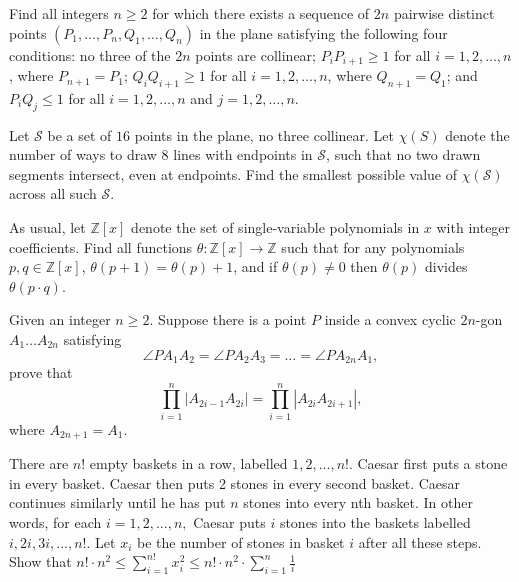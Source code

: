 \documentclass[11pt]{scrartcl}
\begin{document}
\begin{problem}[817429246000759]
Find all integers $n \geq 2$ for which there exists a sequence of $2n$ pairwise distinct points $(P_1, \dots, P_n, Q_1, \dots, Q_n)$ in the plane satisfying the following four conditions:
no three of the $2n$ points are collinear;
$P_iP_{i+1} \ge 1$ for all $i = 1, 2, \dots ,n$, where $P_{n+1}=P_1$;
$Q_iQ_{i+1} \ge 1$ for all $i = 1, 2, \dots, n$, where $Q_{n+1} = Q_1$; and
$P_iQ_j \le 1$ for all $i = 1, 2, \dots, n$ and $j = 1, 2, \dots, n$.

\end{problem}
\begin{problem}[711016608896725]
Let $\mathcal S$ be a set of $16$ points in the plane, no three collinear. Let $\chi(S)$ denote the number of ways to draw $8$ lines with endpoints in $\mathcal S$, such that no two drawn segments intersect, even at endpoints. Find the smallest possible value of $\chi(\mathcal S)$ across all such $\mathcal S$.
\end{problem}
\begin{problem}[620629352845047]
As usual, let ${\mathbb Z}[x]$ denote the set of single-variable polynomials in $x$ with integer coefficients. Find all functions $\theta : {\mathbb Z}[x] \to {\mathbb Z}$ such that for any polynomials $p,q \in {\mathbb Z}[x]$,
$\theta(p+1) = \theta(p)+1$, and
if $\theta(p) \neq 0$ then $\theta(p)$ divides $\theta(p \cdot q)$.
\end{problem}
\begin{problem}[702587891849077]
	Given an integer $n \geqslant 2$. Suppose there is a point $P$ inside a convex cyclic $2n$-gon $A_1 \ldots A_{2n}$ satisfying$$\angle PA_1A_2 = \angle PA_2A_3 = \ldots = \angle PA_{2n}A_1,$$prove that$$ \prod_{i=1}^{n} \left|A_{2i - 1}A_{2i} \right| = \prod_{i=1}^{n} \left|A_{2i}A_{2i+1} \right|,$$where $A_{2n + 1} = A_1$.
\end{problem}
\begin{problem}[3579058550991835669]
There are $n!$ empty baskets in a row, labelled $1, 2, . . . , n!$. Caesar
first puts a stone in every basket. Caesar then puts 2 stones in every second basket.
Caesar continues similarly until he has put $n$ stones into every nth basket. In
other words, for each $i = 1, 2, . . . , n,$ Caesar puts $i$ stones into the baskets labelled
$i, 2i, 3i, . . . , n!.$
Let $x_i$ be the number of stones in basket $i$ after all these steps. Show that
$n! \cdot n^2 \leq \sum_{i=1}^{n!} x_i^2 \leq n! \cdot n^2 \cdot \sum_{i=1}^{n} \frac{1}{i} $
\end{problem}
\end{document}
